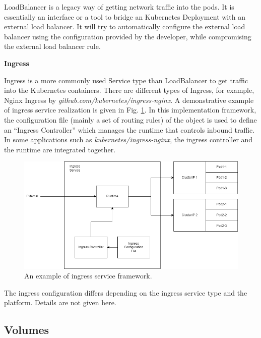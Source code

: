 LoadBalancer is a legacy way of getting network traffic into the pods. It is essentially an interface or a tool to bridge an Kubernetes Deployment with an external load balancer. It will try to automatically configure the external load balancer using the configuration provided by the developer, while compromising the external load balancer rule.

\vspace{0.1in}
\noindent \textbf{Ingress}
\vspace{0.1in}

Ingress is a more commonly used Service type than LoadBalancer to get traffic into the Kubernetes containers. There are different types of Ingress, for example, Nginx Ingress by \textit{github.com/kubernetes/ingress-nginx}. A demonstrative example of ingress service realization is given in Fig. \ref{ch:vac:fig:ingress_service}. In this implementation framework, the configuration file (mainly a set of routing rules) of the object is used to define an ``Ingress Controller'' which manages the runtime that controls inbound traffic. In some applications such as \textit{kubernetes/ingress-nginx}, the ingress controller and the runtime are integrated together.

\begin{figure}[htbp]
	\centering
	\includegraphics[width=350pt]{chapters/part-3/figures/ingress_service.png}
	\caption{An example of ingress service framework.} \label{ch:vac:fig:ingress_service}
\end{figure}

The ingress configuration differs depending on the ingress service type and the platform. Details are not given here.

\subsection{Volumes} \label{ch:vac:subsec:k8svolume}

